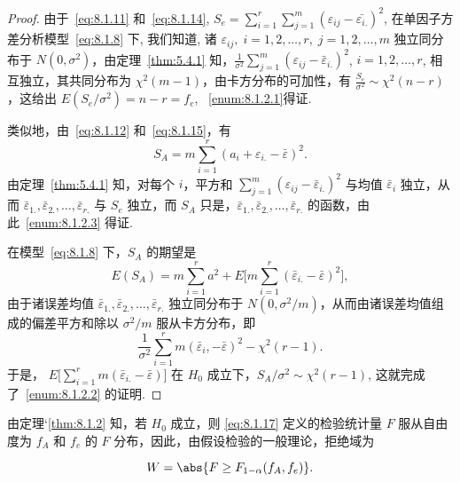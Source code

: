 \begin{proof}
由于~\eqref{eq:8.1.11} 和~\eqref{eq:8.1.14}, $S_{e}=\sum\limits_{i=1}^{r} \sum\limits_{j=1}^{m}(\varepsilon_{i j}-\bar{\varepsilon_{i.}})^{2}$, 在单因子方差分析模型~\eqref{eq:8.1.8} 下, 我们知道, 诸 $\varepsilon_{ij}, \; i=1,2,\ldots,r,\; j=1,2,\ldots,m$ 独立同分布于 $N(0,\sigma^2)$，由定理~\ref{thm:5.4.1} 知，$\tfrac{1}{\sigma^2} \sum\limits_{j=1}^m (\varepsilon_{ij} - \bar{\varepsilon}_{i.})^2$, $i=1,2,\ldots,r$, 相互独立，其共同分布为 $\chi^2(m-1)$，由卡方分布的可加性，有 $\tfrac{S_e}{\sigma^2} \sim \chi^2(n-r)$，这给出 $E(S_e/\sigma^2) = n-r=f_e$, ~\ref{enum:8.1.2.1}得证.

类似地，由~\eqref{eq:8.1.12} 和~\eqref{eq:8.1.15}，有
\begin{equation*}
  S_A =  m \sum_{i=1}^r (a_i + \varepsilon_{i.} - \bar{\varepsilon})^2.
\end{equation*}
由定理~\ref{thm:5.4.1} 知，对每个 $i$，平方和 $\sum\limits_{j=1}^m (\varepsilon_{ij} - \bar{\varepsilon}_{i.})^2$ 与均值 $\bar{\varepsilon}_{i}$ 独立，从而 $\bar{\varepsilon}_{1.}, \bar{\varepsilon}_{2.},\ldots,\bar{\varepsilon}_{r.}$ 与 $S_e$ 独立，而 $S_A$ 只是，$\bar{\varepsilon}_{1.}, \bar{\varepsilon}_{2.},\ldots,\bar{\varepsilon}_{r.}$ 的函数，由此~\ref{enum:8.1.2.3} 得证.

在模型~\ref{eq:8.1.8} 下，$S_A$ 的期望是
\begin{equation*}
  E(S_A) = m \sum_{i=1}^r a^2 + E\big[m\sum_{i=1}^r (\bar{\varepsilon}_{i.} - \bar{\varepsilon})^2\big],
\end{equation*}
由于诸误差均值 $\bar{\varepsilon}_{1.}, \bar{\varepsilon}_{2.},\ldots,\bar{\varepsilon}_{r.}$ 独立同分布于 $N(0, \sigma^2/m)$，从而由诸误差均值组成的偏差平方和除以 $\sigma^2/m$ 服从卡方分布，即
\begin{equation*}
  \frac{1}{\sigma^{2}} \sum_{i=1}^{r} m\left(\bar{\varepsilon}_{i},-\bar{\varepsilon}\right)^{2}-\chi^{2}(r-1).
\end{equation*}
于是， $E\big[\sum\limits_{i=1}^r m(\bar{\varepsilon}_{i.} - \bar{\varepsilon})\big]$ 在 $H_0$ 成立下，$S_A/\sigma^2 \sim \chi^2(r-1)$, 这就完成了~\ref{enum:8.1.2.2} 的证明.
\end{proof}

由定理`\ref{thm:8.1.2} 知，若 $H_0$ 成立，则 \eqref{eq:8.1.17} 定义的检验统计量 $F$ 服从自由度为 $f_A$ 和 $f_e$ 的 $F$ 分布，因此，由假设检验的一般理论，拒绝域为

\begin{equation}\label{eq:8.1.18}
W =\abs{F \geq F_{1-\alpha}(f_{A}, f_{e})} .
\end{equation}

